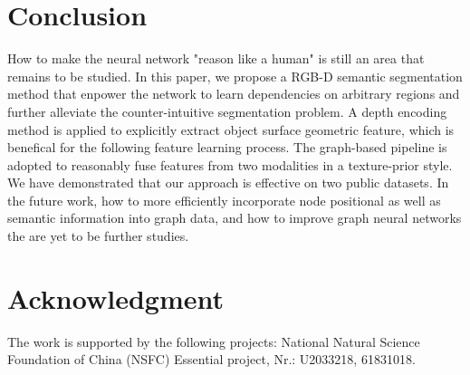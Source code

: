 ﻿\documentclass[journal]{IEEEtran}
\begin{document}
\section{Conclusion}
    How to make the neural network "reason like a human" is still an area that remains to be studied. In this paper, we propose a RGB-D semantic segmentation method that enpower the network to learn dependencies on arbitrary regions and further alleviate the counter-intuitive segmentation problem. A depth encoding method is applied to explicitly extract object surface geometric feature, which is benefical for the following feature learning process. The graph-based pipeline is adopted to reasonably fuse features from two modalities in a texture-prior style. We have demonstrated that our approach is effective on two public datasets. In the future work, how to more efficiently incorporate node positional as well as semantic information into graph data, and how to improve graph neural networks the are yet to be further studies.

\section*{Acknowledgment}
    The work is supported by the following projects: National Natural Science Foundation of China (NSFC) Essential project, Nr.: U2033218, 61831018.
 

% 


\end{document}
